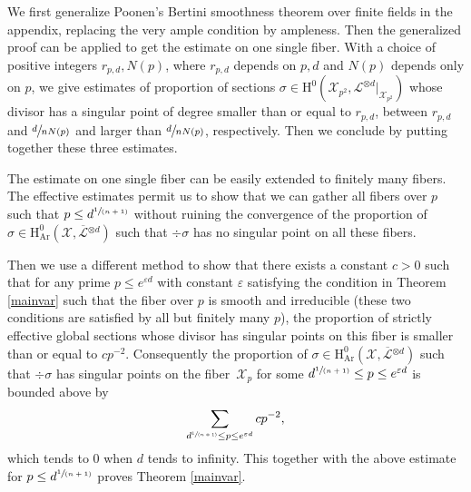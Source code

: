 \documentclass[11pt]{article}
\numberwithin{equation}{section}
\newcommand{\spfrac}[2]{\sfrac{#1}{(#2)}}
\theoremstyle{plain}
\theoremstyle{definition}
\newcommand{\ho}{\mathrm{H}}
\newcommand{\X}{\mathcal{X}}
\newcommand{\Li}{\overline{\mathcal{L}}{}}
\newcommand{\li}{\mathcal{L}}
\begin{document}
We first generalize Poonen's Bertini smoothness theorem over finite fields in the appendix, replacing the very ample condition by ampleness. Then the generalized proof can be applied to get the estimate on one single fiber. With a choice of positive integers $r_{p,d},N(p)$, where $r_{p,d}$ depends on $p,d$ and $N(p)$ depends only on $p$, we give estimates of proportion of sections $\sigma\in \ho^0(\X_{p^2}, \li^{\otimes d}|_{\X_{p^2}})$ whose divisor has a singular point of degree smaller than or equal to $r_{p,d}$, between $r_{p,d}$ and $\sfrac{d}{nN(p)}$ and larger than $\sfrac{d}{nN(p)}$, respectively. Then we conclude by putting together these three estimates.

The estimate on one single fiber can be easily extended to finitely many fibers. The effective estimates permit us to show that we can gather all fibers over $p$ such that $p\leq d^{\spfrac{1}{n+1}}$ without ruining the convergence of the proportion of $\sigma \in \ho^0_{\mathrm{Ar}}(\X, \Li^{\otimes d})$ such that $\div \sigma$ has no singular point on all these fibers.

Then we use a different method to show that there exists a constant $c>0$ such that for any prime $ p \leq e^{\varepsilon d}$ with constant $\varepsilon$ satisfying the condition in Theorem \ref{mainvar} such that the fiber over $p$ is smooth and irreducible (these two conditions are satisfied by all but finitely many $p$), the proportion of strictly effective global sections whose divisor has singular points on this fiber is smaller than or equal to $cp^{-2}$. Consequently the proportion of $\sigma \in \ho^0_{\mathrm{Ar}}(\X, \Li^{\otimes d})$ such that $\div \sigma$ has singular points on the fiber~$\X_p$ for some $d^{\spfrac{1}{n+1}}\leq p \leq e^{\varepsilon d}$ is bounded above by
\[
\sum_{d^{\spfrac{1}{n+1}}\leq p \leq e^{\varepsilon d}}cp^{-2},
\]
which tends to $0$ when $d$ tends to infinity. This together with the above estimate for $p\leq d^{\spfrac{1}{n+1}}$ proves Theorem \ref{mainvar}.
\end{document}
